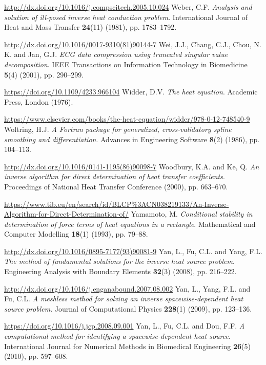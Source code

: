 \begin{thebibliography}{301}
\url{http://dx.doi.org/10.1016/j.compscitech.2005.10.024}
%
%
 Weber, C.F. {\it Analysis and solution of ill-posed inverse heat conduction problem}. International Journal of Heat and Mass Transfer {\bf 24}(11) (1981), pp. 1783--1792.

\url{http://dx.doi.org/10.1016/0017-9310(81)90144-7}
%
%
 Wei, J.J., Chang, C.J., Chou, N. K. and Jan, G.J. {\it ECG data compression using truncated singular value decomposition}. IEEE Transactions on Information Technology in Biomedicine {\bf 5}(4) (2001), pp. 290--299.

\url{https://doi.org/10.1109/4233.966104}
%
%
 Widder, D.V. {\it The heat equation}. Academic Press, London (1976).

\url{https://www.elsevier.com/books/the-heat-equation/widder/978-0-12-748540-9}
%
%
 Woltring, H.J. {\it A Fortran package for generalized, cross-validatory spline smoothing and differentiation}. Advances in Engineering Software {\bf 8}(2) (1986), pp. 104--113.

\url{http://dx.doi.org/10.1016/0141-1195(86)90098-7}
%
%
 Woodbury, K.A. and Ke, Q. {\it An inverse algorithm for direct determination of heat transfer coefficients}. Proceedings of National Heat Transfer Conference (2000), pp. 663--670.

\url{https://www.tib.eu/en/search/id/BLCP\%3ACN038219133/An-Inverse-Algorithm-for-Direct-Determination-of/}
%
%
 Yamamoto, M. {\it Conditional stability in determination of force terms of heat equations in a rectangle}. Mathematical and Computer Modelling {\bf 18}(1) (1993), pp. 79--88.

\url{http://dx.doi.org/10.1016/0895-7177(93)90081-9}
%
 Yan, L., Fu, C.L. and Yang, F.L. {\it The method of fundamental solutions for the inverse heat source problem}. Engineering Analysis with Boundary Elements {\bf 32}(3) (2008), pp. 216--222.

\url{http://dx.doi.org/10.1016/j.enganabound.2007.08.002}
%
%
 Yan, L., Yang, F.L. and Fu, C.L. {\it A meshless method for solving an inverse spacewise-dependent heat source problem}. Journal of Computational Physics {\bf 228}(1) (2009), pp. 123--136.

\url{https://doi.org/10.1016/j.jcp.2008.09.001}
%
%
 Yan, L., Fu, C.L. and Dou, F.F. {\it A computational method for identifying a spacewise-dependent heat source}. International Journal for Numerical Methods in Biomedical Engineering {\bf 26}(5) (2010), pp. 597--608.


\end{thebibliography}
